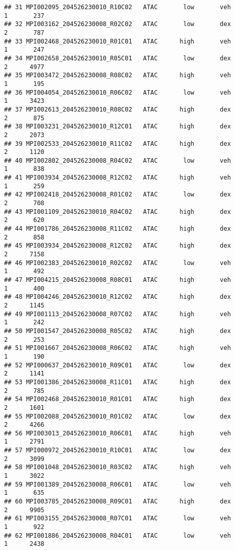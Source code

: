 \documentclass[
]{article}
\begin{document}
\begin{verbatim}
## 31 MPI002095_204526230010_R10C02   ATAC       low       veh         1       237
## 32 MPI003162_204526230008_R02C02   ATAC       low       dex         2       787
## 33 MPI002468_204526230010_R01C01   ATAC      high       veh         1       247
## 34 MPI002658_204526230010_R05C01   ATAC       low       dex         2      4977
## 35 MPI003472_204526230008_R08C02   ATAC      high       veh         1       195
## 36 MPI004054_204526230010_R06C02   ATAC       low       veh         1      3423
## 37 MPI002613_204526230010_R08C02   ATAC      high       dex         2       875
## 38 MPI003231_204526230010_R12C01   ATAC      high       dex         2      2073
## 39 MPI002533_204526230010_R11C02   ATAC      high       dex         2      1120
## 40 MPI002802_204526230008_R04C02   ATAC       low       veh         1       838
## 41 MPI003934_204526230008_R12C02   ATAC      high       veh         1       259
## 42 MPI002418_204526230008_R01C02   ATAC       low       dex         2       708
## 43 MPI001109_204526230010_R04C02   ATAC      high       dex         2       620
## 44 MPI001786_204526230008_R11C02   ATAC      high       dex         2       858
## 45 MPI003934_204526230008_R12C02   ATAC      high       dex         2      7158
## 46 MPI002383_204526230010_R02C02   ATAC       low       veh         1       492
## 47 MPI004215_204526230008_R08C01   ATAC      high       veh         1       400
## 48 MPI004246_204526230010_R12C02   ATAC      high       dex         2      1145
## 49 MPI001113_204526230008_R07C02   ATAC      high       veh         1       242
## 50 MPI001547_204526230008_R05C02   ATAC      high       dex         2       253
## 51 MPI001667_204526230008_R06C02   ATAC      high       veh         1       190
## 52 MPI000637_204526230010_R09C01   ATAC       low       dex         2      1141
## 53 MPI001386_204526230008_R11C01   ATAC      high       dex         2       785
## 54 MPI002468_204526230010_R01C01   ATAC      high       dex         2      1601
## 55 MPI002088_204526230010_R01C02   ATAC       low       dex         2      4266
## 56 MPI003013_204526230010_R06C01   ATAC      high       veh         1      2791
## 57 MPI000972_204526230010_R10C01   ATAC       low       dex         2      3099
## 58 MPI001048_204526230010_R03C02   ATAC      high       veh         1      3022
## 59 MPI001389_204526230008_R06C01   ATAC       low       veh         1       635
## 60 MPI003785_204526230008_R09C01   ATAC      high       dex         2      9905
## 61 MPI003155_204526230008_R07C01   ATAC       low       veh         1       922
## 62 MPI001886_204526230008_R04C01   ATAC       low       veh         1      2438

\end{verbatim}
\end{document}
